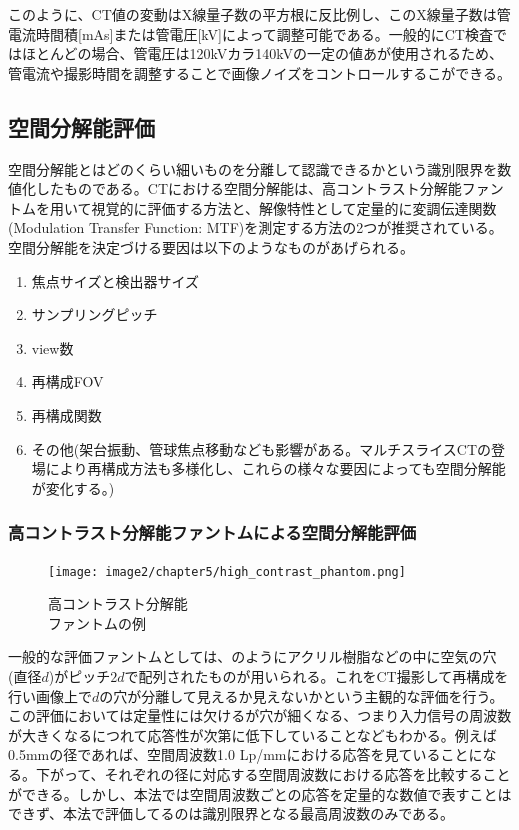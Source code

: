 このように、CT値の変動はX線量子数の平方根に反比例し、このX線量子数は管電流時間積[mAs]または管電圧[kV]によって調整可能である。一般的にCT検査ではほとんどの場合、管電圧は120kVカラ140kVの一定の値あが使用されるため、管電流や撮影時間を調整することで画像ノイズをコントロールするこができる。
\fi


\subsection{空間分解能評価}
空間分解能とはどのくらい細いものを分離して認識できるかという識別限界を数値化したものである。CTにおける空間分解能は、高コントラスト分解能ファントムを用いて視覚的に評価する方法と、解像特性として定量的に変調伝達関数(Modulation Transfer Function: MTF)を測定する方法の2つが推奨されている。空間分解能を決定づける要因は以下のようなものがあげられる。
\begin{enumerate}
\item 焦点サイズと検出器サイズ
\item サンプリングピッチ
\item view数
\item 再構成FOV
\item 再構成関数
\item その他(架台振動、管球焦点移動なども影響がある。マルチスライスCTの登場により再構成方法も多様化し、これらの様々な要因によっても空間分解能が変化する。)
\end{enumerate}

\subsubsection*{高コントラスト分解能ファントムによる空間分解能評価}

\begin{figure}[H]
 \begin{center}
 \texttt{[image: image2/chapter5/high\_contrast\_phantom.png]} 
 \end{center}
 \caption{高コントラスト分解能\\ファントムの例}
 \label{fig:high_contrast_phantom}
\end{figure}
一般的な評価ファントムとしては、のようにアクリル樹脂などの中に空気の穴(直径$d$)がピッチ$2d$で配列されたものが用いられる。これをCT撮影して再構成を行い画像上で$d$の穴が分離して見えるか見えないかという主観的な評価を行う。この評価においては定量性には欠けるが穴が細くなる、つまり入力信号の周波数が大きくなるにつれて応答性が次第に低下していることなどもわかる。例えば0.5mmの径であれば、空間周波数1.0 Lp/mmにおける応答を見ていることになる。下がって、それぞれの径に対応する空間周波数における応答を比較することができる。しかし、本法では空間周波数ごとの応答を定量的な数値で表すことはできず、本法で評価してるのは識別限界となる最高周波数のみである。



